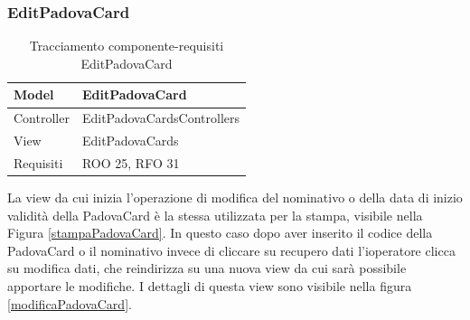 \subsubsection{EditPadovaCard}
\def\arraystretch{2}
\begin{table}[H]
\centering
\begin{tabular}{|l|l|}
\hline
Model & EditPadovaCard \\ \hline
Controller & EditPadovaCardsControllers \\ \hline
View & EditPadovaCards \\ \hline
Requisiti & ROO 25, RFO 31 \\ \hline
\end{tabular}
\caption{Tracciamento componente-requisiti EditPadovaCard}
\end{table}

\begin{table}[H]
\centering
{}
\caption{Controller:EditPadovaCard}
\end{table}

La view da cui inizia l'operazione di modifica del nominativo o della data di inizio validità della PadovaCard è la stessa utilizzata per la stampa, visibile nella Figura \ref{stampaPadovaCard}. In questo caso dopo aver inserito il codice della PadovaCard o il nominativo invece di cliccare su recupero dati l'ioperatore clicca su modifica dati, che reindirizza su una nuova view da cui sarà possibile apportare le modifiche. I dettagli di questa view sono visibile nella figura \ref{modificaPadovaCard}.

